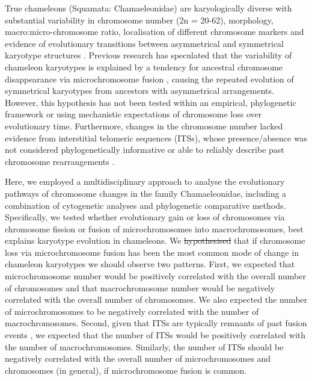 \documentclass[a4paper, 12pt]{article}
\providecommand{\DIFadd}[1]{{\protect\color{blue}\uwave{#1}}} %
\providecommand{\DIFdel}[1]{{\protect\color{red}\sout{#1}}}                      %
\providecommand{\DIFaddbegin}{} %
\providecommand{\DIFaddend}{} %
\providecommand{\DIFdelbegin}{} %
\providecommand{\DIFdelend}{} %
\newcommand{\DIFscaledelfig}{0.5}
\newlength{\DIFdelgraphicswidth} %
\newlength{\DIFdelgraphicsheight} %
\newcommand{\DIFaddincludegraphics}[2][]{{\color{blue}\fbox{\DIFOincludegraphics[#1]{#2}}}} %
\newcommand{\DIFdelincludegraphics}[2][]{%
\sbox{\DIFdelgraphicsbox}{\DIFOincludegraphics[#1]{#2}}%
\settoboxwidth{\DIFdelgraphicswidth}{\DIFdelgraphicsbox} %
\settoboxtotalheight{\DIFdelgraphicsheight}{\DIFdelgraphicsbox} %
\scalebox{\DIFscaledelfig}{%
\parbox[b]{\DIFdelgraphicswidth}{\usebox{\DIFdelgraphicsbox}\\[-\baselineskip] \rule{\DIFdelgraphicswidth}{0em}}\llap{\resizebox{\DIFdelgraphicswidth}{\DIFdelgraphicsheight}{%
\setlength{\unitlength}{\DIFdelgraphicswidth}%
\begin{picture}(1,1)%
\thicklines\linethickness{2pt} %
{\color[rgb]{1,0,0}\put(0,0){\framebox(1,1){}}}%
{\color[rgb]{1,0,0}\put(0,0){\line( 1,1){1}}}%
{\color[rgb]{1,0,0}\put(0,1){\line(1,-1){1}}}%
\end{picture}%
}\hspace*{3pt}}} %
} %
\DeclareRobustCommand{\DIFaddbegin}{\DIFOaddbegin \let\includegraphics\DIFaddincludegraphics} %
\DeclareRobustCommand{\DIFaddend}{\DIFOaddend \let\includegraphics\DIFOincludegraphics} %
\DeclareRobustCommand{\DIFdelbegin}{\DIFOdelbegin \let\includegraphics\DIFdelincludegraphics} %
\DeclareRobustCommand{\DIFdelend}{\DIFOaddend \let\includegraphics\DIFOincludegraphics} %
\begin{document}
True chameleons (Squamata: \DIFaddbegin \DIFadd{Iguania: }\DIFaddend Chamaeleonidae) are karyologically diverse with substantial variability in chromosome number (2n = 20-62), morphology, macro:micro-chromosome ratio, localisation of different chromosome markers and evidence of evolutionary transitions between asymmetrical and symmetrical karyotype structures \citep{rovatsos2017evolution,nielsen2018dynamic}.
Previous research has speculated that the variability of chameleon karyotypes is explained by a tendency for ancestral chromosome disappearance via microchromosome fusion \citep{rovatsos2017evolution}, causing the repeated evolution of symmetrical karyotypes from ancestors with asymmetrical arrangements. 
However, this hypothesis has not been tested within an empirical, phylogenetic framework or using mechanistic expectations of chromosome loss over evolutionary time. 
Furthermore, changes in the chromosome number lacked evidence from interstitial telomeric sequences (ITSs), whose presence/absence was not considered phylogenetically informative or able to reliably describe past chromosome rearrangements \citep{rovatsos2017evolution}.

Here, we employed a multidisciplinary approach to analyse the evolutionary pathways of chromosome changes in the family Chamaeleonidae, including a combination of cytogenetic analyses and phylogenetic comparative methods. 
Specifically, we tested whether evolutionary gain or loss of chromosomes via chromosome fission or fusion of microchromosomes into macrochromosomes, best explains karyotype evolution in chameleons. 
We \DIFdelbegin \DIFdel{hypothesised }\DIFdelend \DIFaddbegin \DIFadd{hypothesized }\DIFaddend that if chromosome loss via microchromosome fusion has been the most common mode of change in chameleon karyotypes we should observe two patterns. 
First, we expected that microchromosome number would be positively correlated with the overall number of chromosomes and that macrochromosome number would be negatively correlated with the overall number of chromosomes. 
We also expected the number of microchromosomes to be negatively correlated with the number of macrochromosomes. 
Second, given that ITSs are typically remnants of past fusion events \citep{bolzan2017interstitial}, we expected that the number of ITSs would be positively correlated with the number of macrochromosomes. 
Similarly, the number of ITSs should be negatively correlated with the overall number of microchromosomes and chromosomes (in general), if microchromosome fusion is common. 
\end{document}
